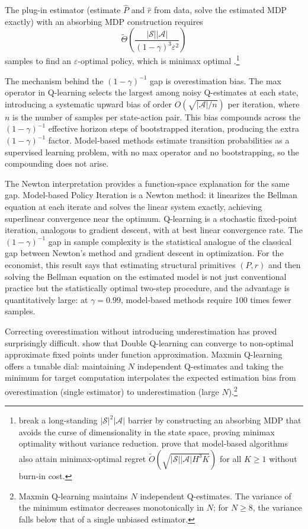 \begin{theorem}
\label{thm:model_based_sample}
The plug-in estimator (estimate $\hat{P}$ and $\hat{r}$ from data, solve the estimated MDP exactly) with an absorbing MDP construction requires
\[
\tilde{\Theta}\!\left(\frac{|\mathcal{S}||\mathcal{A}|}{(1-\gamma)^3 \varepsilon^2}\right)
\]
samples to find an $\varepsilon$-optimal policy, which is minimax optimal \citep{li2024breaking}.\footnote{\citet{li2024breaking} break a long-standing $|\mathcal{S}|^2|\mathcal{A}|$ barrier by constructing an absorbing MDP that avoids the curse of dimensionality in the state space, proving minimax optimality without variance reduction. \citet{zhang2024settling} prove that model-based algorithms also attain minimax-optimal regret $\tilde{O}(\sqrt{|\mathcal{S}||\mathcal{A}|H^3K})$ for all $K \geq 1$ without burn-in cost.}
\end{theorem}

The mechanism behind the $(1-\gamma)^{-1}$ gap is overestimation bias. The max operator in Q-learning selects the largest among noisy Q-estimates at each state, introducing a systematic upward bias of order $O(\sqrt{|\mathcal{A}|/n})$ per iteration, where $n$ is the number of samples per state-action pair. This bias compounds across the $(1-\gamma)^{-1}$ effective horizon steps of bootstrapped iteration, producing the extra $(1-\gamma)^{-1}$ factor. Model-based methods estimate transition probabilities as a supervised learning problem, with no max operator and no bootstrapping, so the compounding does not arise.

The Newton interpretation provides a function-space explanation for the same gap. Model-based Policy Iteration is a Newton method: it linearizes the Bellman equation at each iterate and solves the linear system exactly, achieving superlinear convergence near the optimum. Q-learning is a stochastic fixed-point iteration, analogous to gradient descent, with at best linear convergence rate. The $(1-\gamma)^{-1}$ gap in sample complexity is the statistical analogue of the classical gap between Newton's method and gradient descent in optimization. For the economist, this result says that estimating structural primitives $(P, r)$ and then solving the Bellman equation on the estimated model is not just conventional practice but the statistically optimal two-step procedure, and the advantage is quantitatively large: at $\gamma = 0.99$, model-based methods require 100 times fewer samples.

Correcting overestimation without introducing underestimation has proved surprisingly difficult. \citet{ren2021underestimation} show that Double Q-learning can converge to non-optimal approximate fixed points under function approximation. Maxmin Q-learning \citep{lan2020maxmin} offers a tunable dial: maintaining $N$ independent Q-estimates and taking the minimum for target computation interpolates the expected estimation bias from overestimation (single estimator) to underestimation (large $N$).\footnote{Maxmin Q-learning maintains $N$ independent Q-estimates. The variance of the minimum estimator decreases monotonically in $N$; for $N \geq 8$, the variance falls below that of a single unbiased estimator.}

